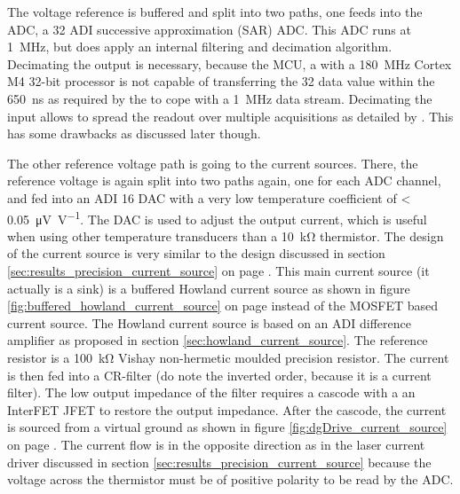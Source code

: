 The voltage reference is buffered and split into two paths, one feeds into the ADC, a \qty{32}{\bit} ADI  \cite{datasheet_LTC2508-32} successive approximation (SAR) ADC. This ADC runs at \qty{1}{\MHz}, but does apply an internal filtering and decimation algorithm. Decimating the output is necessary, because the MCU, a  with a \qty{180}{\MHz} Cortex M4 32-bit processor is not capable of transferring the \qty{32}{\bit} data value within the \qty{650}{\ns} as required by the  to cope with a \qty{1}{\MHz} data stream. Decimating the input allows to spread the readout over multiple acquisitions as detailed by \citeauthor{thesis_sattelmaier} \cite{thesis_sattelmaier}. This has some drawbacks as discussed later though.

The other reference voltage path is going to the current sources. There, the reference voltage is again split into two paths again, one for each ADC channel, and fed into an ADI  \cite{datasheet_AD5760} \qty{16}{\bit} DAC with a very low temperature coefficient of \qty{< 0.05}{\uV \per \V}. The DAC is used to adjust the output current, which is useful when using other temperature transducers than a \qty{10}{\kilo\ohm} thermistor. The design of the current source is very similar to the design discussed in section \ref{sec:results_precision_current_source} on page \pageref{sec:results_precision_current_source}. This main current source (it actually is a sink) is a buffered Howland current source as shown in figure \ref{fig:buffered_howland_current_source} on page \pageref{fig:buffered_howland_current_source} instead of the MOSFET based current source. The Howland current source is based on an ADI  \cite{datasheet_LT1997} difference amplifier as proposed in section \ref{sec:howland_current_source}. The reference resistor is a \qty{100}{\kilo\ohm} Vishay  \cite{datasheet_s102} non-hermetic moulded precision resistor. The current is then fed into a CR-filter (do note the inverted order, because it is a current filter). The low output impedance of the filter requires a cascode with a an InterFET  JFET to restore the output impedance. After the cascode, the current is sourced from a virtual ground as shown in figure \ref{fig:dgDrive_current_source} on page \pageref{fig:dgDrive_current_source}. The current flow is in the opposite direction as in the laser current driver discussed in section \ref{sec:results_precision_current_source} because the voltage across the thermistor must be of positive polarity to be read by the ADC.

